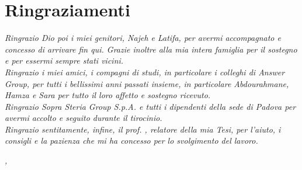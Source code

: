 
\cleardoublepage
{}
{}



\bigskip

\begingroup
\let\clearpage\relax
\let\cleardoublepage\relax
\let\cleardoublepage\relax

\chapter*{Ringraziamenti}


\noindent \textit{Ringrazio Dio poi i miei genitori, Najeh e Latifa, per avermi accompagnato e concesso di arrivare fin qui. Grazie inoltre alla mia intera famiglia per il sostegno e per essermi sempre stati vicini.}\\

\noindent \textit{Ringrazio i miei amici, i compagni di studi, in particolare i colleghi di Answer Group, per tutti i bellissimi anni passati insieme, in particolare Abdourahmane, Hamza e Sara per tutto il loro affetto e sostegno ricevuto.}\\

\noindent \textit{Ringrazio Sopra Steria Group S.p.A. e tutti i dipendenti della sede di Padova per avermi accolto e seguito durante il tirocinio.}\\

\noindent \textit{Ringrazio sentitamente, infine, il prof. \myProf, relatore della mia Tesi, per
l'aiuto, i consigli e la pazienza che mi ha concesso per lo svolgimento del lavoro.}\\

\bigskip

\noindent\textit{\myLocation, \myTime}
\hfill \myName

\endgroup

\blankpage
\blankpage

